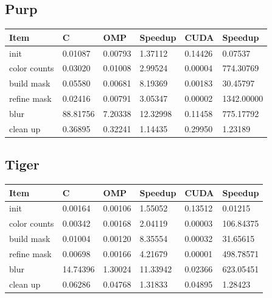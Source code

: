 \documentclass[12pt]{article}
\begin{document}
\subsection{Purp}
\begin{tabular}{l|l|l|l|l|l}
    Item & C & OMP & Speedup & CUDA & Speedup
\\  \hline
    init & 0.01087 & 0.00793 & 1.37112 & 0.14426 & 0.07537
\\  color counts & 0.03020 & 0.01008 & 2.99524 & 0.00004 & 774.30769
\\  build mask & 0.05580 & 0.00681 & 8.19369 & 0.00183 & 30.45797
\\  refine mask & 0.02416 & 0.00791 & 3.05347 & 0.00002 & 1342.00000
\\  blur & 88.81756 & 7.20338 & 12.32998 & 0.11458 & 775.17792
\\  clean up & 0.36895 & 0.32241 & 1.14435 & 0.29950 & 1.23189
\end{tabular}
\subsection{Tiger}
\begin{tabular}{l|l|l|l|l|l}
    Item & C & OMP & Speedup & CUDA & Speedup
\\  \hline
    init & 0.00164 & 0.00106 & 1.55052 & 0.13512 & 0.01215
\\  color counts & 0.00342 & 0.00168 & 2.04119 & 0.00003 & 106.84375
\\  build mask & 0.01004 & 0.00120 & 8.35554 & 0.00032 & 31.65615
\\  refine mask & 0.00698 & 0.00166 & 4.21679 & 0.00001 & 498.78571
\\  blur & 14.74396 & 1.30024 & 11.33942 & 0.02366 & 623.05451
\\  clean up & 0.06286 & 0.04768 & 1.31833 & 0.04895 & 1.28423
\end{tabular}
\end{document}
